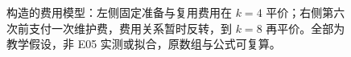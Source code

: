 \begin{figure}[htbp]
\centering

\caption{构造的费用模型：左侧固定准备与复用费用在 $k=4$ 平价；右侧第六次前支付一次维护费，费用关系暂时反转，到 $k=8$ 再平价。全部为教学假设，非 E05 实测或拟合，原数组与公式可复算。}
\label{fig:ch08-kstar}
\end{figure}
